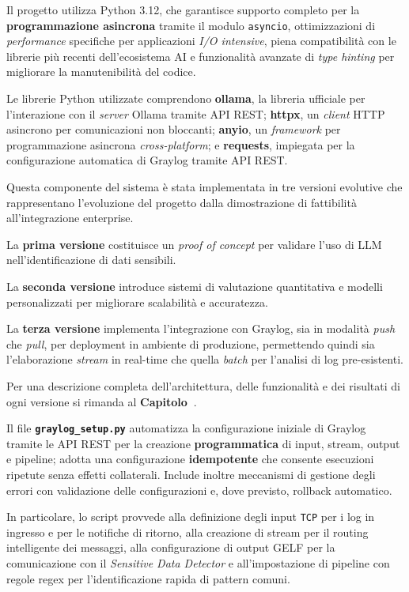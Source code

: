 \documentclass[12pt,twoside]{report}
\begin{document}
Il progetto utilizza Python 3.12, che garantisce supporto completo per la \textbf{programmazione asincrona} tramite il modulo \texttt{asyncio}, ottimizzazioni di \textit{performance} specifiche per applicazioni \textit{I/O intensive}, piena compatibilità con le librerie più recenti dell'ecosistema AI e funzionalità avanzate di \textit{type hinting} per migliorare la manutenibilità del codice.

Le librerie Python utilizzate comprendono \textbf{ollama}, la libreria ufficiale per l'interazione con il \textit{server} Ollama tramite API REST; \textbf{httpx}, un \textit{client} HTTP asincrono per comunicazioni non bloccanti; \textbf{anyio}, un \textit{framework} per programmazione asincrona \textit{cross-platform}; e \textbf{requests}, impiegata per la configurazione automatica di Graylog tramite API REST.

Questa componente del sistema è stata implementata in tre versioni evolutive che rappresentano l'evoluzione del progetto dalla dimostrazione di fattibilità all'integrazione enterprise.

La \textbf{prima versione} costituisce un \textit{proof of concept} per validare l'uso di LLM nell'identificazione di dati sensibili.

La \textbf{seconda versione} introduce sistemi di valutazione quantitativa e modelli personalizzati per migliorare scalabilità e accuratezza.

La \textbf{terza versione} implementa l'integrazione con Graylog, sia in modalità \textit{push} che \textit{pull}, per deployment in ambiente di produzione, permettendo quindi sia l'elaborazione \textit{stream} in real-time che quella \textit{batch} per l'analisi di log pre-esistenti.

Per una descrizione completa dell'architettura, delle funzionalità e dei risultati di ogni versione si rimanda al \textbf{Capitolo~}.

Il file \texttt{\textbf{graylog\_setup.py}} automatizza la configurazione iniziale di Graylog tramite le API REST per la creazione \textbf{programmatica} di input, stream, output e pipeline; adotta una configurazione \textbf{idempotente} che consente esecuzioni ripetute senza effetti collaterali. Include inoltre meccanismi di gestione degli errori con validazione delle configurazioni e, dove previsto, rollback automatico.

In particolare, lo script provvede alla definizione degli input \texttt{TCP} per i log in ingresso e per le notifiche di ritorno, alla creazione di stream per il routing intelligente dei messaggi, alla configurazione di output GELF per la comunicazione con il \textit{Sensitive Data Detector} e all'impostazione di pipeline con regole regex per l'identificazione rapida di pattern comuni.
\end{document}
